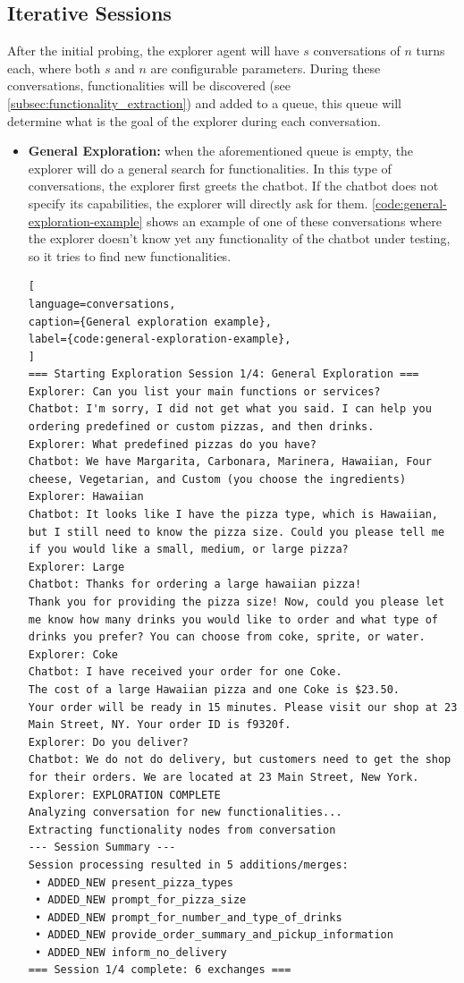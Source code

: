 \subsection{Iterative Sessions}

After the initial probing,
the explorer agent will have $s$ conversations of $n$ turns each,
where both $s$ and $n$ are configurable parameters.
During these conversations, functionalities will be discovered
(see \autoref{subsec:functionality_extraction})
and added to a queue,
this queue will determine what is the goal of the explorer
during each conversation.

\begin{itemize}
  \item \textbf{General Exploration:}
    when the aforementioned queue is empty,
    the explorer will do a general search for functionalities.
    In this type of conversations,
    the explorer first greets the chatbot.
    If the chatbot does not specify its capabilities,
    the explorer will directly ask for them.
    \autoref{code:general-exploration-example}
    shows an example of one of these conversations
    where the explorer doesn't know yet any
    functionality of the chatbot under testing,
    so it tries to find new functionalities.

\begin{lstlisting}[
language=conversations,
caption={General exploration example},
label={code:general-exploration-example},
]
=== Starting Exploration Session 1/4: General Exploration ===
Explorer: Can you list your main functions or services?
Chatbot: I'm sorry, I did not get what you said. I can help you ordering predefined or custom pizzas, and then drinks.
Explorer: What predefined pizzas do you have?
Chatbot: We have Margarita, Carbonara, Marinera, Hawaiian, Four cheese, Vegetarian, and Custom (you choose the ingredients)
Explorer: Hawaiian
Chatbot: It looks like I have the pizza type, which is Hawaiian, but I still need to know the pizza size. Could you please tell me if you would like a small, medium, or large pizza?
Explorer: Large
Chatbot: Thanks for ordering a large hawaiian pizza!
Thank you for providing the pizza size! Now, could you please let me know how many drinks you would like to order and what type of drinks you prefer? You can choose from coke, sprite, or water.
Explorer: Coke
Chatbot: I have received your order for one Coke.
The cost of a large Hawaiian pizza and one Coke is $23.50.
Your order will be ready in 15 minutes. Please visit our shop at 23 Main Street, NY. Your order ID is f9320f.
Explorer: Do you deliver?
Chatbot: We do not do delivery, but customers need to get the shop for their orders. We are located at 23 Main Street, New York.
Explorer: EXPLORATION COMPLETE
Analyzing conversation for new functionalities...
Extracting functionality nodes from conversation
--- Session Summary ---
Session processing resulted in 5 additions/merges:
 • ADDED_NEW present_pizza_types
 • ADDED_NEW prompt_for_pizza_size
 • ADDED_NEW prompt_for_number_and_type_of_drinks
 • ADDED_NEW provide_order_summary_and_pickup_information
 • ADDED_NEW inform_no_delivery
=== Session 1/4 complete: 6 exchanges ===
\end{lstlisting}


\end{itemize}
